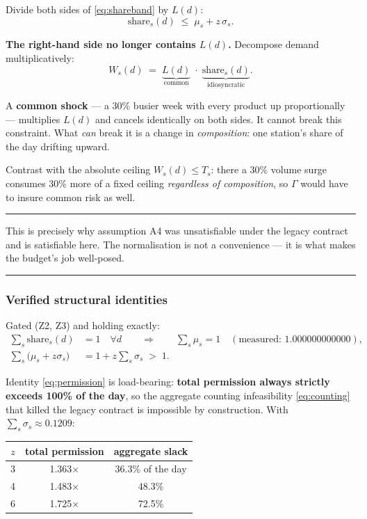 \documentclass[11pt,a4paper]{article}
\newenvironment{keybox}
  {\par\medskip\noindent\rule{\linewidth}{0.9pt}\par\nobreak\smallskip\ignorespaces}
  {\par\smallskip\nobreak\noindent\rule{\linewidth}{0.9pt}\par\medskip}
\begin{document}
Divide both sides of \eqref{eq:shareband} by $L(d)$:
\begin{equation}
  \mathrm{share}_s(d) \;\le\; \mu_s + z\,\sigma_s .
  \label{eq:normalised}
\end{equation}

\textbf{The right-hand side no longer contains $L(d)$.} Decompose demand
multiplicatively:
\[
  W_s(d) \;=\; \underbrace{L(d)}_{\text{common}} \;\cdot\;
               \underbrace{\mathrm{share}_s(d)}_{\text{idiosyncratic}} .
\]

A \textbf{common shock} --- a 30\% busier week with every product up
proportionally --- multiplies $L(d)$ and cancels identically on both sides. It
cannot break this constraint. What \emph{can} break it is a change in
\emph{composition}: one station's share of the day drifting upward.

Contrast with the absolute ceiling $W_s(d)\le T_s$: there a 30\% volume surge
consumes 30\% more of a fixed ceiling \emph{regardless of composition}, so
$\Gamma$ would have to insure common risk as well.

\begin{keybox}
This is precisely why assumption A4 was unsatisfiable under the legacy contract
and is satisfiable here. The normalisation is not a convenience --- it is what
makes the budget's job well-posed.
\end{keybox}

\subsubsection*{Verified structural identities}

Gated (Z2, Z3) and holding exactly:
\begin{align}
  \sum_s \mathrm{share}_s(d) &= 1 \quad \forall d
  \qquad\Longrightarrow\qquad
  \sum_s \mu_s = 1
  \quad(\text{measured: } 1.000000000000), \label{eq:sumshare}\\[2pt]
  \sum_s \bigl(\mu_s + z\sigma_s\bigr) &= 1 + z\sum_s \sigma_s \;>\; 1 .
  \label{eq:permission}
\end{align}

Identity \eqref{eq:permission} is load-bearing: \textbf{total permission always
strictly exceeds 100\% of the day}, so the aggregate counting infeasibility
\eqref{eq:counting} that killed the legacy contract is impossible by
construction. With $\sum_s\sigma_s \approx 0.1209$:

\begin{center}
\begin{tabular}{ccc}
\toprule
$z$ & total permission & aggregate slack \\
\midrule
3 & 1.363$\times$ & 36.3\% of the day \\
4 & 1.483$\times$ & 48.3\% \\
6 & 1.725$\times$ & 72.5\% \\
\bottomrule
\end{tabular}
\end{center}
\end{document}
